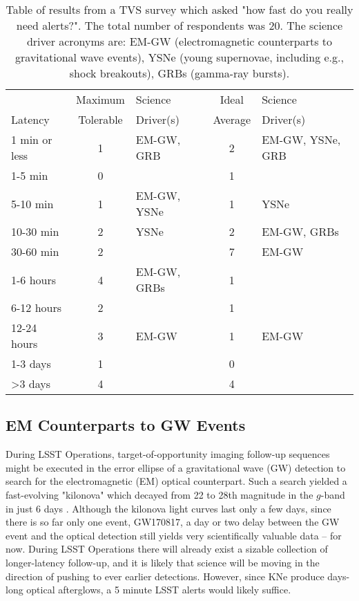 \documentclass[DM,lsstdraft,authoryear,toc]{lsstdoc}
\begin{document}
\begin{table}[h]%
\caption{Table of results from a TVS survey which asked "how fast do you really need alerts?". The total number of respondents was 20. The science driver acronyms are: EM-GW (electromagnetic counterparts to gravitational wave events), YSNe (young supernovae, including e.g., shock breakouts), GRBs (gamma-ray bursts). \label{tab:tvs}}
\begin{center}
\begin{tabular}{|l|cl|cl|}
\hline
             & Maximum & Science & Ideal       & Science \\
Latency & Tolerable  & Driver(s) &  Average & Driver(s) \\
\hline
1 min or less & 1 & EM-GW, GRB  & 2 & EM-GW, YSNe, GRB \\
1-5 min         & 0 &                          & 1 &                                   \\
5-10 min       & 1 & EM-GW, YSNe & 1 & YSNe \\
10-30 min     & 2 & YSNe               & 2 & EM-GW, GRBs \\
30-60 min     & 2 &                          & 7 & EM-GW  \\
1-6 hours     & 4 & EM-GW, GRBs & 1 &  \\
6-12 hours   & 2 &                          & 1 &  \\
12-24 hours & 3 & EM-GW            & 1 & EM-GW \\
1-3 days      & 1 &                           & 0 &  \\
>3 days       & 4 &                           & 4 &  \\
\hline
\end{tabular}
\end{center}
\label{default}
\end{table}%


\subsection{EM Counterparts to GW Events}\label{ssec:latency_emgw}

During LSST Operations, target-of-opportunity imaging follow-up sequences might be executed in the error ellipse of a gravitational wave (GW) detection to search for the electromagnetic (EM) optical counterpart. Such a search yielded a fast-evolving "kilonova" which decayed from 22 to 28th magnitude in the $g$-band in just 6 days \citep[faster in the bluer and slower in the redder filters][]{2017Sci...358.1559K}. Although the kilonova light curves last only a few days, since there is so far only one event, GW170817, a day or two delay between the GW event and the optical detection still yields very scientifically valuable data -- for now. During LSST Operations there will already exist a sizable collection of longer-latency follow-up, and it is likely that science will be moving in the direction of pushing to ever earlier detections. However, since KNe produce days-long optical afterglows, a 5 minute LSST alerts would likely suffice.
\end{document}
